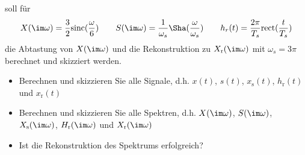 soll für
\begin{align}
X(\im\omega) = \frac{3}{2}\mathrm{sinc}(\frac{\omega}{6})\qquad
%
S(\im\omega)=\frac{1}{\omega_s}\Sha(\frac{\omega}{\omega_s})\qquad
%
h_r(t) = \frac{2\pi}{T_s}\mathrm{rect}(\frac{t}{T_s})
\end{align}
die Abtastung von $X(\im\omega)$ und die Rekonstruktion zu $X_\mathrm{r}(\im\omega)$
mit $\omega_s = 3 \pi$ berechnet und skizziert werden.

\begin{itemize}
  \item Berechnen und skizzieren Sie alle Signale, d.h. $x(t)$, $s(t)$, $x_\mathrm{s}(t)$, $h_\mathrm{r}(t)$ und $x_\mathrm{r}(t)$
  \item Berechnen und skizzieren Sie alle Spektren, d.h.  $X(\im\omega)$, $S(\im\omega)$, $X_\mathrm{s}(\im\omega)$, $H_\mathrm{r}(\im\omega)$ und $X_\mathrm{r}(\im\omega)$
  \item Ist die Rekonstruktion des Spektrums erfolgreich?
\end{itemize}

